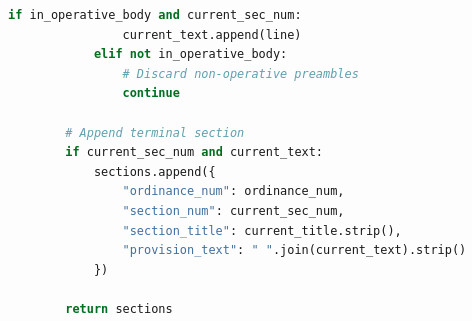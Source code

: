 \begin{lstlisting}[language=Python, caption={Ordinance Segmentation and Boilerplate Filtering}, label={lst:code_ordinance_cleaner}]
            if in_operative_body and current_sec_num:
                current_text.append(line)
            elif not in_operative_body:
                # Discard non-operative preambles
                continue

        # Append terminal section
        if current_sec_num and current_text:
            sections.append({
                "ordinance_num": ordinance_num,
                "section_num": current_sec_num,
                "section_title": current_title.strip(),
                "provision_text": " ".join(current_text).strip()
            })

        return sections
\end{lstlisting}
